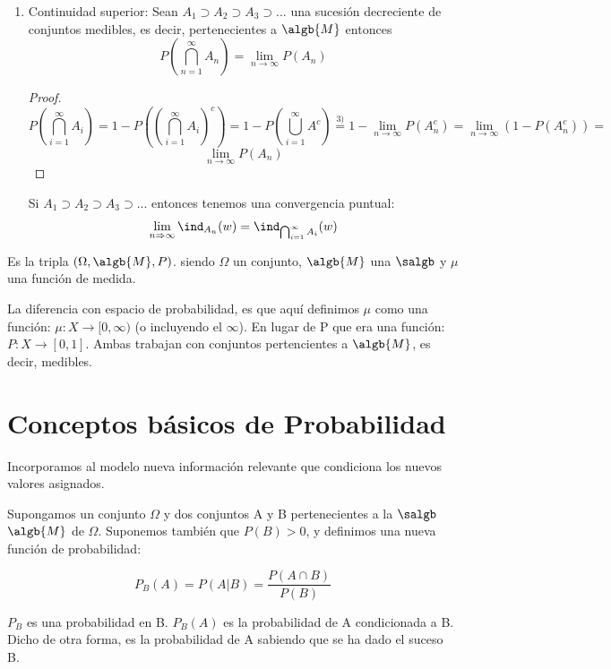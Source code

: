 \documentclass{apuntes}
\begin{document}
\begin{enumerate}
\item Continuidad superior: Sean $A_1 \supset A_2 \supset A_3 \supset ...$ una sucesión decreciente de conjuntos medibles, es decir, pertenecientes a $\algb{M}$ entonces 
\[ P(\bigcap_{n=1}^{\infty}A_n) = \lim_{n \rightarrow \infty} P(A_n)
\]

\begin{proof}
\[P(\bigcap_{i=1}^{\infty}A_i) = 1-P\left((\bigcap_{i=1}^{\infty}A_i)^c\right)=1-P(\bigcup_{i=1}^{\infty}A^c) \stackrel{3)}{=} 1-\lim_{n \rightarrow \infty}P(A_n^c)=\lim_{n \rightarrow \infty}(1-P(A_n^c)) = 
\]
\[
\lim_{n \rightarrow \infty}P(A_n)
\]
\end{proof}

\obs Si $A_1 \supset A_2 \supset A_3 \supset...$ entonces tenemos una convergencia puntual:
\[
\lim_{n \Rightarrow \infty}\ind_{A_n}(w) = \ind_{\bigcap_{i=1}^{\infty}A_i}(w)
\]
\end{enumerate}


\begin{defn}
 Es la tripla $(\Omega, \algb{M}, P)$. siendo $\Omega$ un conjunto, $\algb{M}$ una $\salgb$ y $\mu$ una función de medida.
\end{defn}

La diferencia con espacio de probabilidad, es que aquí definimos $\mu$ como una función: $\mu: X \rightarrow [0,\infty)$  (o incluyendo el $\infty$). En lugar de P que era una función: $P: X \rightarrow [0,1]$. Ambas trabajan con conjuntos pertencientes a $\algb{M}$, es decir, medibles.


\section{Conceptos básicos de Probabilidad}
Incorporamos al modelo nueva información relevante que condiciona los nuevos valores asignados.

\begin{defn}
Supongamos un conjunto $\Omega$ y dos conjuntos A y B pertenecientes a la $\salgb$ $\algb{M}$ de $\Omega$. Suponemos también que $P(B)>0$, y definimos una nueva función de probabilidad:

\[ P_B(A) = P(A | B) = \frac{P(A \cap B)}{P(B)}\]

$P_B$ es una probabilidad en B. $P_B(A)$ es la probabilidad de A condicionada a B. Dicho de otra forma, es la probabilidad de A sabiendo que se ha dado el suceso B.
\end{defn}
\end{document}
